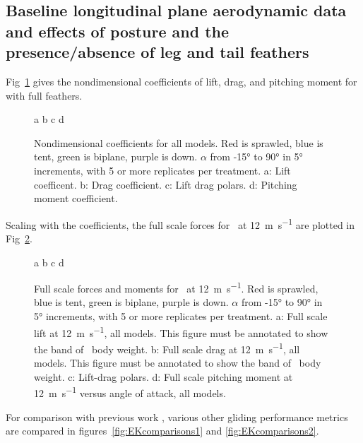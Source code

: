 \subsection{Baseline longitudinal plane aerodynamic data and effects of posture and the presence/absence of leg and tail feathers}
Fig~\ref{fig:coeffsvsaoa} gives the nondimensional coefficients of lift, drag, and pitching moment for \Mgui with full feathers.  
\begin{figure}
a %
b %
c %
d %
\caption{{ Nondimensional coefficients for all models.}  Red is sprawled, blue is tent, green is biplane, purple is down. $\alpha$ from \ang{-15} to \ang{90} in \ang{5} increments, with 5 or more replicates per treatment. a: Lift coefficent. b: Drag coefficient. c: Lift drag polars.  d: Pitching moment coefficient.}
\label{fig:coeffsvsaoa}
\end{figure}
Scaling with the coefficients, the full scale forces for \Mgui\ at \SI{12}{\meter\per\second} are plotted in Fig~\ref{fig:fsall}.
\begin{figure}
a %
b %
c %
d %
\caption{{ Full scale forces and moments for \Mgui\ at \SI{12}{\meter\per\second}}.  Red is sprawled, blue is tent, green is biplane, purple is down. $\alpha$ from \ang{-15} to \ang{90} in \ang{5} increments, with 5 or more replicates per treatment. a: Full scale lift at \SI{12}{\meter\per\second}, all models. This figure must be annotated to show the band of \Mgui\ body weight. b:  Full scale drag at \SI{12}{\meter\per\second}, all models. This figure must be annotated to show the band of \Mgui\ body weight. c: Lift-drag polars. d: Full scale pitching moment at \SI{12}{\meter\per\second} versus angle of attack, all models.}
\label{fig:fsall}
\end{figure}
For comparison with previous work \citep{Emerson:1990b}, various other gliding performance metrics are compared in figures~\ref{fig:EKcomparisons1} and \ref{fig:EKcomparisons2}.  
